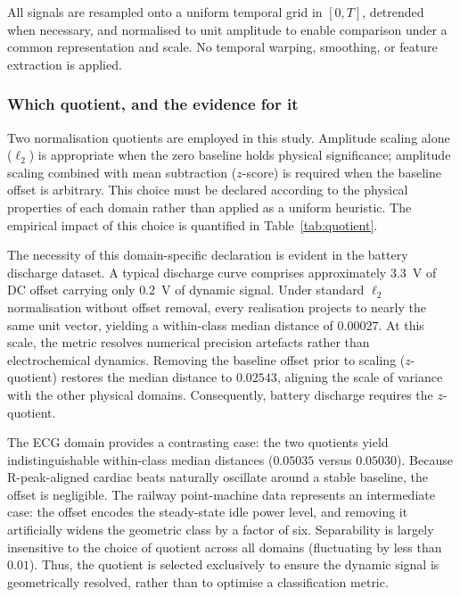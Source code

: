 \documentclass[10pt]{article}
\theoremstyle{plain}
\theoremstyle{definition}
\theoremstyle{remark}
\newcommand{\fitwidth}[1]{%
  \resizebox{\ifdim\width>\linewidth\linewidth\else\width\fi}{!}{#1}}
\begin{document}
All signals are resampled onto a uniform temporal grid in $[0,T]$, detrended
when necessary, and normalised to unit amplitude to enable comparison under a
common representation and scale. No temporal warping, smoothing, or feature
extraction is applied.

\subsubsection{Which quotient, and the evidence for it}
\label{sec:quotient}

Two normalisation quotients are employed in this study. Amplitude scaling alone
($\ell_2$) is appropriate when the zero baseline holds physical significance;
amplitude scaling combined with mean subtraction ($z$-score) is required when
the baseline offset is arbitrary. This choice must be declared according to the
physical properties of each domain rather than applied as a uniform heuristic.
The empirical impact of this choice is quantified in Table~\ref{tab:quotient}.

The necessity of this domain-specific declaration is evident in the battery
discharge dataset. A typical discharge curve comprises approximately $3.3$~V of
DC offset carrying only $0.2$~V of dynamic signal. Under standard $\ell_2$
normalisation without offset removal, every realisation projects to nearly the
same unit vector, yielding a within-class median distance of $0.00027$. At this
scale, the metric resolves numerical precision artefacts rather than
electrochemical dynamics. Removing the baseline offset prior to scaling
($z$-quotient) restores the median distance to $0.02543$, aligning the scale of
variance with the other physical domains. Consequently, battery discharge
requires the $z$-quotient.

The ECG domain provides a contrasting case: the two quotients yield indistinguishable within-class median distances ($0.05035$ versus $0.05030$).
Because R-peak-aligned cardiac beats naturally oscillate around a stable
baseline, the offset is negligible. The railway point-machine data represents an
intermediate case: the offset encodes the steady-state idle power level, and
removing it artificially widens the geometric class by a factor of six.
Separability is largely insensitive to the choice of
quotient across all domains (fluctuating by less than $0.01$). Thus, the
quotient is selected exclusively to ensure the dynamic signal is geometrically
resolved, rather than to optimise a classification metric.

\begin{table}[!htbp]\centering\small
\fitwidth{}
\caption{\small The two quotients on the physical domains. \emph{within med.} is
the median within-class cosine distance and \emph{separab.} is
$P(d_{\mathrm{within}} < d_{\mathrm{between}})$. The declared choice is $\ell_2$
for the point machine and ECG and $z$ for battery discharge.}
\label{tab:quotient}
\end{table}
\end{document}
